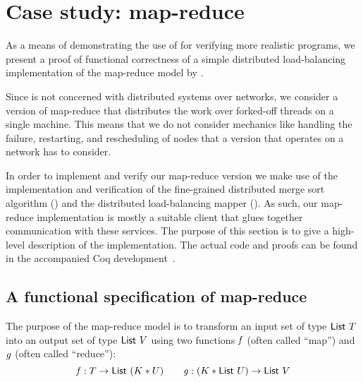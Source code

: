 \section{Case study: map-reduce}
\label{sec:map_reduce}

As a means of demonstrating the use of \lname for verifying more
realistic programs, we present a proof of functional correctness
of a simple distributed load-balancing implementation of the map-reduce model
by \citet{dean-OSDI2004}.

Since \lname is not concerned with distributed systems over networks, we
consider a version of map-reduce that distributes the work over forked-off
threads on a single machine.
This means that we do not consider mechanics like handling the failure,
restarting, and rescheduling of nodes that a version that operates on a network
has to consider.

In order to implement and verify our map-reduce version we make use of the
implementation and verification of the fine-grained distributed merge sort
algorithm () and the distributed load-balancing
mapper ().
As such, our map-reduce implementation is mostly a suitable client that glues
together communication with these services.
The purpose of this section is to give a high-level description of the
implementation.
The actual code and proofs can be found in the accompanied
Coq development~\cite{actris_coq}.

\subsection{A functional specification of map-reduce}
\label{sec:map_reduce_functional}

\newcommand{\mapreducename}{\defemph{map\_reduce}}
\newcommand{\vmapreducename}{\valuefy{\mapreducename}}
\newcommand{\curryvar}{\defemph{curry}}
\newcommand{\redvar}{\logemph{g}}
\newcommand{\vredvar}{\valuefy{\redvar}}
\newcommand{\tvarK}{K}
\newcommand{\maptype}{\tvar \to \List\ (\tvarK * \tvarB)}
\newcommand{\redtype}{(\tvarK * \List\ \tvarB) \to \List\ \tvarC}
\newcommand{\groupname}{\defemph{group}}

The purpose of the map-reduce model is to transform an input set of type
$\mathsf{List}\ T$ into an output set of type $\mathsf{List}\ V$
using two functions $\mathit{f}$ (often called ``map'') and $\redvar$ (often
called ``reduce''):
\[
\mapvar : \maptype
\quad\quad
\redvar : \redtype
\]


